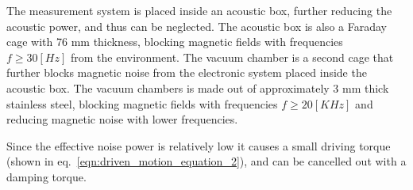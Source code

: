 \documentclass[\main/master.tex]{subfiles}
\begin{document}
The measurement system is placed inside an acoustic box, further reducing the acoustic power, and thus can be neglected. 
The acoustic box is also a Faraday cage with 76 mm thickness, blocking magnetic fields with frequencies $f \ge 30 [Hz]$ from the environment. The vacuum chamber is a second cage that further blocks magnetic noise from the electronic system placed inside the acoustic box. The vacuum chambers is made out of approximately 3 mm thick stainless steel, blocking magnetic fields with frequencies $f\ge 20 [KHz]$ and reducing magnetic noise with lower frequencies.
\par\noindent
Since the effective noise power is relatively low  it causes a small driving torque (shown in eq.~\ref{eqn:driven_motion_equation_2}), and can be cancelled out with a damping torque.
\end{document}
